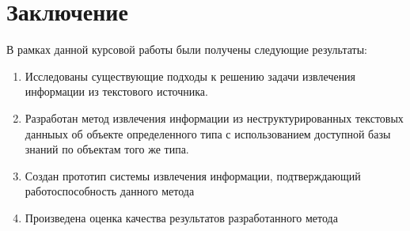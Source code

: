 \chapter*{Заключение}

В рамках данной курсовой работы были получены следующие результаты:
\begin{enumerate}
	\item Исследованы существующие подходы к решению задачи извлечения информации из текстового источника.
	\item Разработан метод извлечения информации из неструктурированных текстовых данныых об объекте определенного типа с использованием доступной базы знаний по объектам того же типа.
	\item Создан прототип системы извлечения информации, подтверждающий работоспособность данного метода
	\item Произведена оценка качества результатов разработанного метода
\end{enumerate}
